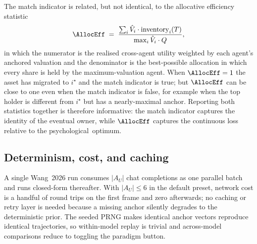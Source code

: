 The match indicator is related, but not identical, to the
allocative efficiency statistic
\begin{equation}
\AllocEff\;=\;\frac{\sum_i \hat{V}_i\cdot\text{inventory}_i(T)}
{\max_i\hat{V}_i\cdot Q},
\label{eq:ae}
\end{equation}
in which the numerator is the realised cross-agent utility weighted
by each agent's anchored valuation and the denominator is the
best-possible allocation in which every share is held by the
maximum-valuation agent. When $\AllocEff=1$ the asset has migrated to
$i^\star$ and the match indicator is true; but $\AllocEff$ can be close to
one even when the match indicator is false, for example when the
top holder is different from $i^\star$ but has a nearly-maximal
anchor. Reporting both statistics together is therefore
informative: the match indicator captures the identity of the
eventual owner, while $\AllocEff$ captures the continuous loss relative
to the psychological~optimum.

\subsection{Determinism, cost, and caching}

A single Wang~2026 run consumes $|A_U|$ chat completions as one
parallel batch and runs closed-form thereafter. With $|A_U|\le 6$
in the default preset, network cost is a handful of round trips on
the first frame and zero afterwards; no caching or retry layer is
needed because a missing anchor silently degrades to the
deterministic prior. The seeded PRNG makes identical anchor vectors
reproduce identical trajectories, so within-model replay is trivial
and across-model comparisons reduce to toggling the paradigm button.

